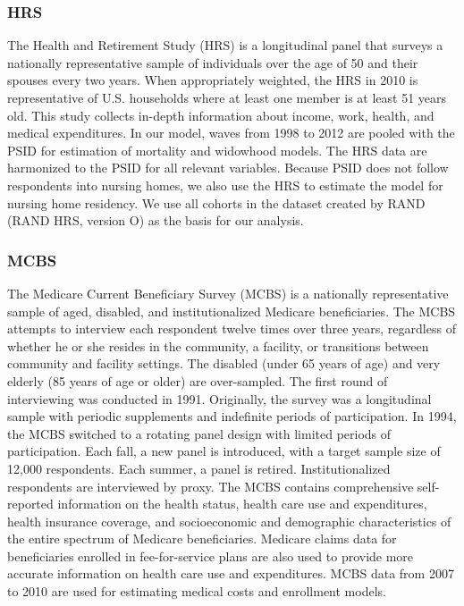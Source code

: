 \subsubsection{HRS}

\noindent The Health and Retirement Study (HRS) is a longitudinal panel that surveys a nationally representative sample of individuals over the age of 50 and their spouses every two years.  When appropriately weighted, the HRS in 2010 is representative of U.S. households 
where at least one member is at least 51 years old.
This study collects in-depth information about income, work, health, and medical expenditures. In our model, waves from 1998 to 2012 are pooled with the PSID for estimation of mortality and 
widowhood models. The HRS data
are harmonized to the PSID for all relevant variables. Because PSID does not follow respondents into nursing homes, we also use the HRS to estimate the model for nursing home residency.  We use all cohorts in the dataset created by RAND (RAND HRS, version O) as the basis 
for our analysis. \\

\subsubsection{MCBS}
\noindent The Medicare Current Beneficiary Survey (MCBS) is a nationally representative sample of aged, disabled, 
and institutionalized Medicare beneficiaries.  The MCBS attempts to interview each respondent twelve 
times over three years, regardless of whether he or she resides in the community, a facility, or 
transitions between community and facility settings. The disabled (under 65 years of age) and 
very elderly (85 years of age or older) are over-sampled. The first round of interviewing was conducted 
in 1991. Originally, the survey was a longitudinal sample with periodic supplements and indefinite 
periods of participation. In 1994, the MCBS switched to a rotating panel design with limited periods 
of participation. Each fall, a new panel is introduced, with a target sample size of 12,000 respondents. Each summer, a panel is retired. Institutionalized respondents are interviewed by proxy.  The MCBS 
contains comprehensive self-reported information on the health status, health care use and 
expenditures, health insurance coverage, and socioeconomic and demographic characteristics of the 
entire spectrum of Medicare beneficiaries.  Medicare claims data for beneficiaries enrolled in 
fee-for-service plans are also used to provide more accurate information on health care use and 
expenditures.  MCBS data from 2007 to 2010 are used for estimating medical costs and enrollment models. \\


